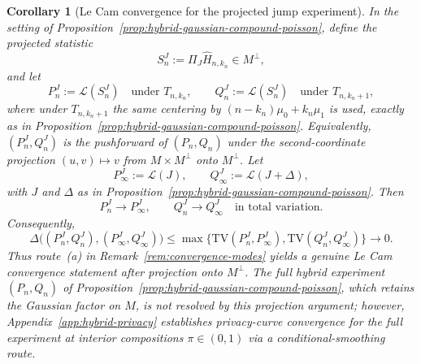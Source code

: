 \documentclass{article}
\newtheorem{corollary}[theorem]{Corollary}
\begin{document}
\begin{corollary}[Le Cam convergence for the projected jump experiment]
\label{cor:projected-jump-lecam}
In the setting of Proposition~\ref{prop:hybrid-gaussian-compound-poisson}, define the projected
statistic
\[
S_n^J:=\Pi_J\widehat H_{n,k_n}\in M^\perp,
\]
and let
\[
P_n^J:=\mathcal L(S_n^J) \quad \text{under } T_{n,k_n},
\qquad
Q_n^J:=\mathcal L(S_n^J) \quad \text{under } T_{n,k_n+1},
\]
where under $T_{n,k_n+1}$ the same centering by $(n-k_n)\mu_0+k_n\mu_1$ is used, exactly as in
Proposition~\ref{prop:hybrid-gaussian-compound-poisson}. Equivalently, $(P_n^J,Q_n^J)$ is the
pushforward of $(P_n,Q_n)$ under the second-coordinate projection $(u,v)\mapsto v$ from
$M\times M^\perp$ onto $M^\perp$. Let
\[
P_\infty^J:=\mathcal L(J),
\qquad
Q_\infty^J:=\mathcal L(J+\Delta),
\]
with $J$ and $\Delta$ as in Proposition~\ref{prop:hybrid-gaussian-compound-poisson}. Then
\[
P_n^J \to P_\infty^J,
\qquad
Q_n^J \to Q_\infty^J
\quad \text{in total variation.}
\]
Consequently,
\[
\Delta\bigl((P_n^J,Q_n^J),(P_\infty^J,Q_\infty^J)\bigr)
\leq
\max\bigl\{\mathrm{TV}(P_n^J,P_\infty^J),\mathrm{TV}(Q_n^J,Q_\infty^J)\bigr\}
\to 0.
\]
Thus route~\textup{(a)} in Remark~\ref{rem:convergence-modes} yields a genuine Le Cam convergence
statement after projection onto $M^\perp$. The full hybrid experiment $(P_n,Q_n)$ of Proposition~\ref{prop:hybrid-gaussian-compound-poisson}, which retains the Gaussian factor on $M$, is not resolved by this projection argument; however, Appendix~\ref{app:hybrid-privacy} establishes privacy-curve convergence for the full experiment at interior compositions $\pi\in(0,1)$ via a conditional-smoothing route.
\end{corollary}
\end{document}
